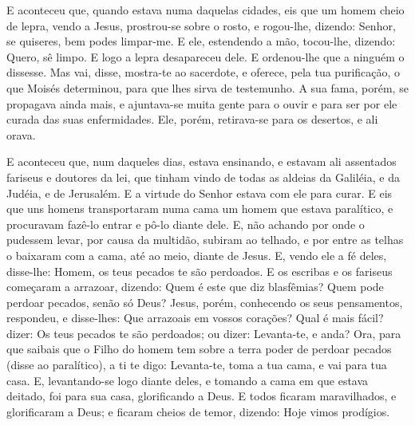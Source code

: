 E aconteceu que, quando estava numa daquelas cidades, eis que um
homem cheio de lepra, vendo a Jesus, prostrou-se sobre o rosto, e
rogou-lhe, dizendo: Senhor, se quiseres, bem podes limpar-me.
E ele, estendendo a mão, tocou-lhe, dizendo: Quero, sê limpo.
E logo a lepra desapareceu dele. E ordenou-lhe que a ninguém
o dissesse. Mas vai, disse, mostra-te ao sacerdote, e oferece, pela
tua purificação, o que Moisés determinou, para que lhes sirva de
testemunho. A sua fama, porém, se propagava ainda mais, e
ajuntava-se muita gente para o ouvir e para ser por ele curada das
suas enfermidades. Ele, porém, retirava-se para os desertos,
e ali orava.

E aconteceu que, num daqueles dias, estava ensinando, e estavam
ali assentados fariseus e doutores da lei, que tinham vindo de todas
as aldeias da Galiléia, e da Judéia, e de Jerusalém. E a virtude do
Senhor estava com ele para curar. E eis que uns homens
transportaram numa cama um homem que estava paralítico, e procuravam
fazê-lo entrar e pô-lo diante dele. E, não achando por onde o
pudessem levar, por causa da multidão, subiram ao telhado, e por
entre as telhas o baixaram com a cama, até ao meio, diante de Jesus.
E, vendo ele a fé deles, disse-lhe: Homem, os teus pecados te
são perdoados. E os escribas e os fariseus começaram a
arrazoar, dizendo: Quem é este que diz blasfêmias? Quem pode perdoar
pecados, senão só Deus? Jesus, porém, conhecendo os seus
pensamentos, respondeu, e disse-lhes: Que arrazoais em vossos
corações? Qual é mais fácil? dizer: Os teus pecados te são
perdoados; ou dizer: Levanta-te, e anda? Ora, para que
saibais que o Filho do homem tem sobre a terra poder de perdoar
pecados (disse ao paralítico), a ti te digo: Levanta-te, toma a tua
cama, e vai para tua casa. E, levantando-se logo diante
deles, e tomando a cama em que estava deitado, foi para sua casa,
glorificando a Deus. E todos ficaram maravilhados, e
glorificaram a Deus; e ficaram cheios de temor, dizendo: Hoje vimos
prodígios.


